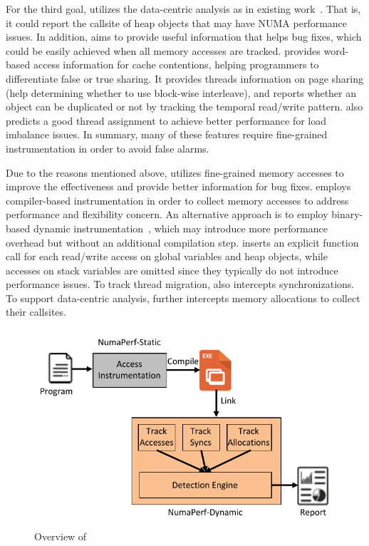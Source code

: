 For the third goal, \NP{} utilizes the data-centric analysis as in existing work~\cite{XuNuma}. That is, it could report the callsite of heap objects that may have NUMA performance issues. 
In addition, \NP{} aims to provide useful information that helps bug fixes, which could be easily achieved when all memory accesses are tracked. \NP{} provides word-based access information for cache contentions, helping programmers to differentiate false or true sharing. It provides threads information on page sharing (help determining whether to use block-wise interleave), and reports whether an object can be duplicated or not by tracking the temporal read/write pattern.
\NP{} also predicts a good thread assignment to achieve better performance for load imbalance issues. In summary, many of these features require fine-grained instrumentation in order to avoid false alarms. 


Due to the reasons mentioned above, \NP{} utilizes fine-grained memory accesses to improve the effectiveness and provide better information for bug fixes. \NP{} employs compiler-based instrumentation in order to collect memory accesses to address performance and flexibility concern. An alternative approach is to employ binary-based dynamic instrumentation~\cite{DynamoRlO, Valgrind, Pin}, which may introduce more performance overhead but without an additional compilation step. \NP{} inserts an explicit function call for each read/write access on global variables and heap objects, while accesses on stack variables are omitted since they typically do not introduce performance issues. To track thread migration, \NP{} also intercepts synchronizations. To support data-centric analysis, \NP{} further intercepts memory allocations to collect their callsites.  
\begin{figure}[!htbp]
\centering
\includegraphics[width=0.98\columnwidth]{figures/overview.pdf}
\caption{Overview of \NP{}\label{fig:overview}}
\vspace{-0.2in}
\end{figure}

